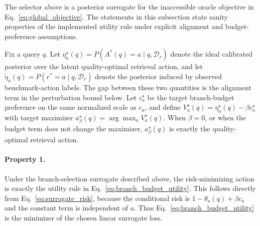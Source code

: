 \documentclass[a4paper,fleqn]{cas-dc}
\begin{document}
The selector above is a posterior surrogate for the inaccessible oracle objective in Eq.~\eqref{eq:global_objective}. The statements in this subsection state sanity properties of the implemented utility rule under explicit alignment and budget-preference assumptions.

Fix a query $q$. Let $\eta_a^\star(q)=P(A^*(q)=a\mid q,\mathcal{D}_r)$ denote the ideal calibrated posterior over the latent quality-optimal retrieval action, and let $\tilde{\eta}_a(q)=P(r^*=a\mid q,\mathcal{D}_r)$ denote the posterior induced by observed benchmark-action labels. The gap between these two quantities is the alignment term in the perturbation bound below. Let $c_a^\star$ be the target branch-budget preference on the same normalized scale as $c_a$, and define $V_a^\star(q)=\eta_a^\star(q)-\beta c_a^\star$ with target maximizer $a_\beta^\star(q)=\arg\max_a V_a^\star(q)$. When $\beta=0$, or when the budget term does not change the maximizer, $a_\beta^\star(q)$ is exactly the quality-optimal retrieval action.

\paragraph{Property 1.}
Under the branch-selection surrogate described above, the risk-minimizing action is exactly the utility rule in Eq.~\eqref{eq:branch_budget_utility}. This follows directly from Eq.~\eqref{eq:surrogate_risk}, because the conditional risk is $1-\theta_a(q)+\beta c_a$ and the constant term is independent of $a$. Thus Eq.~\eqref{eq:branch_budget_utility} is the minimizer of the chosen linear surrogate loss.
\end{document}
